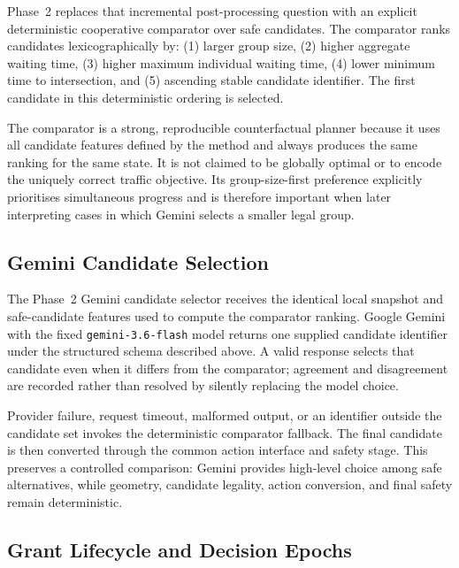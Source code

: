 \documentclass[letterpaper,10pt,conference]{ieeeconf}
\begin{document}
Phase~2 replaces that incremental post-processing question with an explicit deterministic cooperative comparator over safe candidates. The comparator ranks candidates lexicographically by: (1) larger group size, (2) higher aggregate waiting time, (3) higher maximum individual waiting time, (4) lower minimum time to intersection, and (5) ascending stable candidate identifier. The first candidate in this deterministic ordering is selected.



The comparator is a strong, reproducible counterfactual planner because it uses all candidate features defined by the method and always produces the same ranking for the same state. It is not claimed to be globally optimal or to encode the uniquely correct traffic objective. Its group-size-first preference explicitly prioritises simultaneous progress and is therefore important when later interpreting cases in which Gemini selects a smaller legal group.



\subsection{Gemini Candidate Selection}



The Phase~2 Gemini candidate selector receives the identical local snapshot and safe-candidate features used to compute the comparator ranking. Google Gemini with the fixed \texttt{gemini-3.6-flash} model returns one supplied candidate identifier under the structured schema described above. A valid response selects that candidate even when it differs from the comparator; agreement and disagreement are recorded rather than resolved by silently replacing the model choice.



Provider failure, request timeout, malformed output, or an identifier outside the candidate set invokes the deterministic comparator fallback. The final candidate is then converted through the common action interface and safety stage. This preserves a controlled comparison: Gemini provides high-level choice among safe alternatives, while geometry, candidate legality, action conversion, and final safety remain deterministic.



\subsection{Grant Lifecycle and Decision Epochs}
\end{document}
